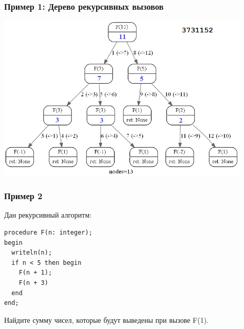 \begin{frame}[fragile]
\frametitle{Пример 1: Дерево рекурсивных вызовов}

\includegraphics[height=8cm, center]{images/rec011.png}
\end{frame}

\begin{frame}[fragile]
\frametitle{Пример 2}

Дан рекурсивный алгоритм:
\begin{lstlisting}[style=CStyle]
procedure F(n: integer);
begin
  writeln(n);
  if n < 5 then begin
    F(n + 1);
    F(n + 3)
  end
end;

\end{lstlisting}
Найдите сумму чисел, которые будут выведены при вызове F(1).

\end{frame}

